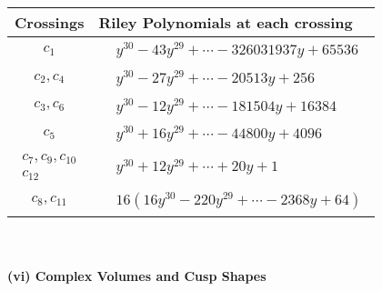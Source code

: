 \documentclass[1p]{elsarticle_modified}
\theoremstyle{definition}
\begin{document}
\begin{tabular}{m{50pt}|m{274pt}}
Crossings & \hspace{64pt}Riley Polynomials at each crossing \\
\hline $$\begin{aligned}c_{1}\end{aligned}$$&$\begin{aligned}
&y^{30}-43 y^{29}+\cdots-326031937 y+65536
\end{aligned}$\\
\hline $$\begin{aligned}c_{2},c_{4}\end{aligned}$$&$\begin{aligned}
&y^{30}-27 y^{29}+\cdots-20513 y+256
\end{aligned}$\\
\hline $$\begin{aligned}c_{3},c_{6}\end{aligned}$$&$\begin{aligned}
&y^{30}-12 y^{29}+\cdots-181504 y+16384
\end{aligned}$\\
\hline $$\begin{aligned}c_{5}\end{aligned}$$&$\begin{aligned}
&y^{30}+16 y^{29}+\cdots-44800 y+4096
\end{aligned}$\\
\hline $$\begin{aligned}c_{7},c_{9},c_{10}\\c_{12}\end{aligned}$$&$\begin{aligned}
&y^{30}+12 y^{29}+\cdots+20 y+1
\end{aligned}$\\
\hline $$\begin{aligned}c_{8},c_{11}\end{aligned}$$&$\begin{aligned}
&16(16 y^{30}-220 y^{29}+\cdots-2368 y+64)
\end{aligned}$\\
\hline
\end{tabular}\\~\\
\newpage\flushleft \textbf{(vi) Complex Volumes and Cusp Shapes}
\end{document}
